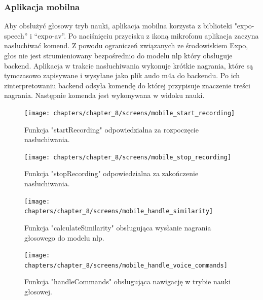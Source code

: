 \subsubsection{Aplikacja mobilna}
Aby obsłużyć głosowy tryb nauki, aplikacja mobilna korzysta z biblioteki "expo-speech” i “expo-av”. Po naciśnięciu przycisku z ikoną mikrofonu aplikacja zaczyna nasłuchiwać komend. Z powodu ograniczeń związanych ze środowiskiem Expo, głos nie jest strumieniowany bezpośrednio do modelu nlp który obsługuje backend. Aplikacja w trakcie nasłuchiwania wykonuje krótkie nagrania, które są tymczasowo zapisywane i wysyłane jako plik audo m4a do backendu. Po ich zinterpretowaniu backend odsyła komendę do której przypisuje znaczenie treści nagrania. Następnie komenda jest wykonywana w widoku nauki.



\begin{figure}[H]
    \centering
    \texttt{[image: chapters/chapter\_8/screens/mobile\_start\_recording]}
    \caption{Funkcja "startRecording" odpowiedzialna za rozpoczęcie nasłuchiwania.}
    \label{img:mobile_start_recording}
\end{figure}

\begin{figure}[H]
    \centering
    \texttt{[image: chapters/chapter\_8/screens/mobile\_stop\_recording]}
    \caption{Funkcja "stopRecording" odpowiedzialna za zakończenie nasłuchiwania.}
    \label{img:mobile_stop_recording}
\end{figure}

\begin{figure}[H]
    \centering
    \texttt{[image: chapters/chapter\_8/screens/mobile\_handle\_similarity]}
    \caption{Funkcja "calculateSimilarity" obsługująca wysłanie nagrania głosowego do modelu nlp.}
    \label{img:mobile_handle_similarity}
\end{figure}

\begin{figure}[H]
    \centering
    \texttt{[image: chapters/chapter\_8/screens/mobile\_handle\_voice\_commands]}
    \caption{Funkcja "handleCommands" obsługująca nawigację w trybie nauki głosowej.}
    \label{img:mobile_handle_voice_commands}
\end{figure}

